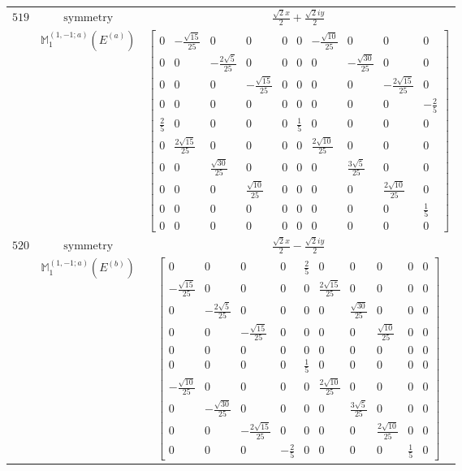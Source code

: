 \documentclass[fleqn,8pt,landscape]{jsarticle}
\begin{document}
\begin{longtable}{ccc}
$ 519 $ & $ \text{symmetry} $ & $ \frac{\sqrt{2} x}{2} + \frac{\sqrt{2} i y}{2} $ \\
$  $ & $ \mathbb{M}_{1}^{(1,-1;a)}(E^{(a)}) $ & $ \begin{bmatrix} 0 & - \frac{\sqrt{15}}{25} & 0 & 0 & 0 & 0 & - \frac{\sqrt{10}}{25} & 0 & 0 & 0 \\ 0 & 0 & - \frac{2 \sqrt{5}}{25} & 0 & 0 & 0 & 0 & - \frac{\sqrt{30}}{25} & 0 & 0 \\ 0 & 0 & 0 & - \frac{\sqrt{15}}{25} & 0 & 0 & 0 & 0 & - \frac{2 \sqrt{15}}{25} & 0 \\ 0 & 0 & 0 & 0 & 0 & 0 & 0 & 0 & 0 & - \frac{2}{5} \\ \frac{2}{5} & 0 & 0 & 0 & 0 & \frac{1}{5} & 0 & 0 & 0 & 0 \\ 0 & \frac{2 \sqrt{15}}{25} & 0 & 0 & 0 & 0 & \frac{2 \sqrt{10}}{25} & 0 & 0 & 0 \\ 0 & 0 & \frac{\sqrt{30}}{25} & 0 & 0 & 0 & 0 & \frac{3 \sqrt{5}}{25} & 0 & 0 \\ 0 & 0 & 0 & \frac{\sqrt{10}}{25} & 0 & 0 & 0 & 0 & \frac{2 \sqrt{10}}{25} & 0 \\ 0 & 0 & 0 & 0 & 0 & 0 & 0 & 0 & 0 & \frac{1}{5} \\ 0 & 0 & 0 & 0 & 0 & 0 & 0 & 0 & 0 & 0 \end{bmatrix} $ \\ \hline
$ 520 $ & $ \text{symmetry} $ & $ \frac{\sqrt{2} x}{2} - \frac{\sqrt{2} i y}{2} $ \\
$  $ & $ \mathbb{M}_{1}^{(1,-1;a)}(E^{(b)}) $ & $ \begin{bmatrix} 0 & 0 & 0 & 0 & \frac{2}{5} & 0 & 0 & 0 & 0 & 0 \\ - \frac{\sqrt{15}}{25} & 0 & 0 & 0 & 0 & \frac{2 \sqrt{15}}{25} & 0 & 0 & 0 & 0 \\ 0 & - \frac{2 \sqrt{5}}{25} & 0 & 0 & 0 & 0 & \frac{\sqrt{30}}{25} & 0 & 0 & 0 \\ 0 & 0 & - \frac{\sqrt{15}}{25} & 0 & 0 & 0 & 0 & \frac{\sqrt{10}}{25} & 0 & 0 \\ 0 & 0 & 0 & 0 & 0 & 0 & 0 & 0 & 0 & 0 \\ 0 & 0 & 0 & 0 & \frac{1}{5} & 0 & 0 & 0 & 0 & 0 \\ - \frac{\sqrt{10}}{25} & 0 & 0 & 0 & 0 & \frac{2 \sqrt{10}}{25} & 0 & 0 & 0 & 0 \\ 0 & - \frac{\sqrt{30}}{25} & 0 & 0 & 0 & 0 & \frac{3 \sqrt{5}}{25} & 0 & 0 & 0 \\ 0 & 0 & - \frac{2 \sqrt{15}}{25} & 0 & 0 & 0 & 0 & \frac{2 \sqrt{10}}{25} & 0 & 0 \\ 0 & 0 & 0 & - \frac{2}{5} & 0 & 0 & 0 & 0 & \frac{1}{5} & 0 \end{bmatrix} $ \\ \hline

\end{longtable}
\end{document}
